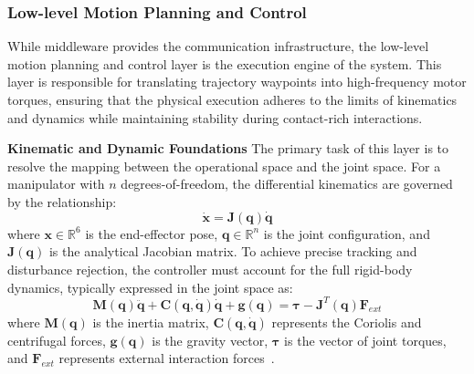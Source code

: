 \documentclass[acmsmall,screen,review,anonymous]{acmart}
\begin{document}
\subsubsection{Low-level Motion Planning and Control}

While middleware provides the communication infrastructure, the low-level motion planning and control layer is the execution engine of the system. This layer is responsible for translating trajectory waypoints into high-frequency motor torques, ensuring that the physical execution adheres to the limits of kinematics and dynamics while maintaining stability during contact-rich interactions.

\textbf{Kinematic and Dynamic Foundations} The primary task of this layer is to resolve the mapping between the operational space and the joint space. For a manipulator with $n$ degrees-of-freedom, the differential kinematics are governed by the relationship:
\begin{equation}
    \dot{\mathbf{x}} = \mathbf{J}(\mathbf{q})\dot{\mathbf{q}}
\end{equation}
where $\mathbf{x} \in \mathbb{R}^6$ is the end-effector pose, $\mathbf{q} \in \mathbb{R}^n$ is the joint configuration, and $\mathbf{J}(\mathbf{q})$ is the analytical Jacobian matrix. To achieve precise tracking and disturbance rejection, the controller must account for the full rigid-body dynamics, typically expressed in the joint space as:
\begin{equation}
    \mathbf{M}(\mathbf{q})\ddot{\mathbf{q}} + \mathbf{C}(\mathbf{q}, \dot{\mathbf{q}})\dot{\mathbf{q}} + \mathbf{g}(\mathbf{q}) = \bm{\tau} - \mathbf{J}^T(\mathbf{q})\mathbf{F}_{ext}
\end{equation}
where $\mathbf{M}(\mathbf{q})$ is the inertia matrix, $\mathbf{C}(\mathbf{q}, \dot{\mathbf{q}})$ represents the Coriolis and centrifugal forces, $\mathbf{g}(\mathbf{q})$ is the gravity vector, $\bm{\tau}$ is the vector of joint torques, and $\mathbf{F}_{ext}$ represents external interaction forces~\cite{sicilianoSpringerHandbookRobotics2016}.
\end{document}
